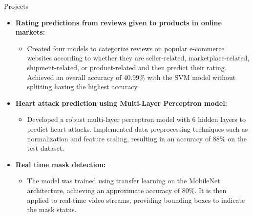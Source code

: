 \documentclass[]{mcdowellcv}
\begin{document}
	\begin{cvsection}{Projects}
		\begin{cvsubsection}{}{}{}
			\begin{itemize}
				\item \textbf{Rating predictions from reviews given to products in online markets:}
				\begin{itemize}
					\item Created four models to categorize reviews on popular e-commerce websites according to whether they are seller-related, marketplace-related, shipment-related, or product-related and then predict their rating. Achieved an overall accuracy of 40.99\% with the SVM model without splitting having the highest accuracy.
				\end{itemize}
				
				
				\item \textbf{Heart attack prediction using Multi-Layer Perceptron model:}
				\begin{itemize}
					\item Developed a robust multi-layer perceptron model with 6 hidden layers to predict heart attacks. Implemented data preprocessing techniques such as normalization and feature scaling, resulting in an accuracy of 88\% on the test dataset.
				\end{itemize}

                \item \textbf{Real time mask detection:}
				\begin{itemize}
					\item The model was trained using transfer learning on the MobileNet architecture, achieving an approximate accuracy of 80\%. It is then applied to real-time video streams, providing bounding boxes to indicate the mask status.
				\end{itemize}
				

\end{itemize}
\end{cvsubsection}
\end{cvsection}
\end{document}
